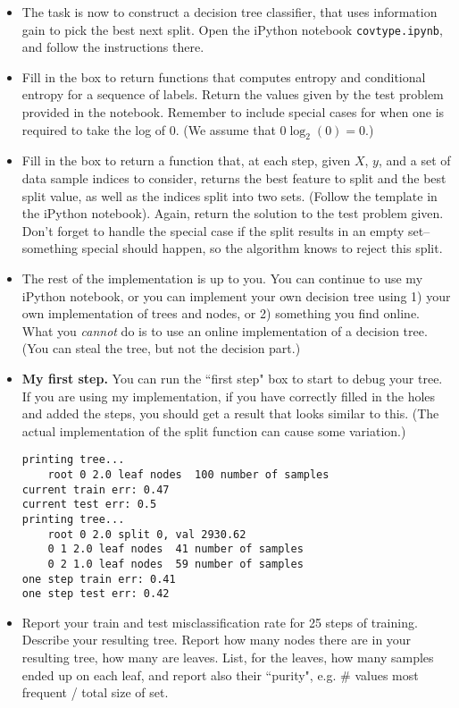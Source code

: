 \documentclass{article}
\begin{document}
\begin{enumerate}
\begin{itemize}
\item The task is now to construct a decision tree classifier, that uses information gain to pick the best next split. Open the iPython notebook \texttt{covtype.ipynb}, and follow the instructions there.

\item Fill in the box to return functions that computes entropy and conditional entropy for a sequence of labels. Return the values given by the test problem provided in the notebook. Remember to include special cases for when one is required to take the log of 0. (We assume that $0\log_2(0) = 0$.)




\item Fill in the box to return  a function that, at each step, given $X$, $y$, and a set of data sample indices to consider, returns the best feature to split and the best split value, as well as the indices split into two sets. (Follow the template in the iPython notebook). Again, return the solution to the test problem given.  Don't forget to handle the special case if the split results in an empty set--something special should happen, so the algorithm knows to reject this split.


\item The rest of the implementation is up to you. You can continue to use my iPython notebook, or you can implement your own decision tree using 1) your own implementation of trees and nodes, or 2) something you find online. What you \emph{cannot} do is to use an online implementation of a decision tree. (You can steal the tree, but not the decision part.) 


\item \textbf{My first step.} You can run the ``first step" box to start to debug your tree.
If you are using my implementation, if you have correctly filled in the holes and added the steps, you should get a result that looks similar to this. (The actual implementation of the split function can cause some variation.)

\begin{verbatim}
printing tree...
    root 0 2.0 leaf nodes  100 number of samples
current train err: 0.47
current test err: 0.5
printing tree...
    root 0 2.0 split 0, val 2930.62
    0 1 2.0 leaf nodes  41 number of samples
    0 2 1.0 leaf nodes  59 number of samples
one step train err: 0.41
one step test err: 0.42
\end{verbatim}

\item Report your train and test misclassification rate for 25 steps of training. Describe your resulting tree. Report how many nodes there are in your resulting tree, how many are leaves. List, for the leaves, how many samples ended up on each leaf, and report also their ``purity", e.g. \# values most frequent / total size of set. 


\end{itemize}
\end{enumerate}
\end{document}
